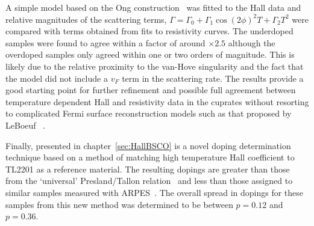 A simple model based on the Ong construction~\cite{Ong1991} was fitted to the Hall data and relative magnitudes of the scattering terms, $\Gamma = \Gamma_0 + \Gamma_1 \cos(2\phi)^2 T + \Gamma_2 T^2$ were compared with terms obtained from fits to resistivity curves. The underdoped samples were found to agree within a factor of around $\times 2.5$ although the overdoped samples only agreed within one or two orders of magnitude. This is likely due to the relative proximity to the van-Hove singularity and the fact that the model did not include a $v_F$ term in the scattering rate. The results provide a good starting point for further refinement and possible full agreement between temperature dependent Hall and resistivity data in the cuprates without resorting to complicated Fermi surface reconstruction models such as that proposed by LeBoeuf \etal~\cite{LeBoeuf2011}.

Finally, presented in chapter~\ref{sec:HallBSCO} is a novel doping determination technique based on a method of matching high temperature Hall coefficient to \ac{TL2201} as a reference material. The resulting dopings are greater than those from the `universal' Presland/Tallon relation~\cite{Presland1991} and less than those assigned to similar samples measured with \ac{ARPES}~\cite{Kondo2004}. The overall spread in dopings for these samples from this new method was determined to be between $p=0.12$ and $p=0.36$.
